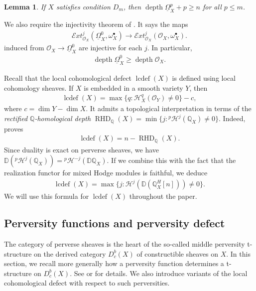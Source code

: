 \documentclass[11pt]{amsart}
\newtheorem{lemma}[equation]{Lemma}
\theoremstyle{definition}
\theoremstyle{plain}
\newcounter{intro}
\DeclareMathOperator{\lcdef}{lcdef}
\DeclareMathOperator{\depth}{depth}
\DeclareMathOperator{\RHD}{RHD}
\begin{document}
\begin{lemma}\label{lem condtion Dm}
If $X$ satisfies condition $D_m$, then $\depth \underline{\Omega}_X^p +p \geq n$ for all $p \leq m$. 
\end{lemma}

We also require the injectivity theorem of \cite{kovacs schwede}. It says the maps
\begin{align*}
    \mathscr{E}xt^j_{\mathscr{O}_X}(\underline{\Omega}_X^0, \omega_X^\bullet) \rightarrow \mathscr{E}xt^j_{\mathscr{O}_X}(\mathscr{O}_X, \omega_X^\bullet).
\end{align*}
induced from $\mathscr{O}_X \rightarrow \underline{\Omega}_X^0$ are injective for each $j$. In particular, 
\begin{align}\label{eqn depth inequ}
   \depth \underline{\Omega}_X^0 \geq \depth \mathscr{O}_X. 
\end{align}

Recall that the local cohomological defect $\lcdef(X)$ is defined using local cohomology sheaves. If $X$ is embedded in a smooth variety $Y$, then
\begin{align*}
    \lcdef(X) = \max \{ q : \mathcal{H}^q_X( \mathscr{O}_Y) \neq 0 \} - c,
\end{align*}
where $c = \dim Y - \dim X$. It admits a topological interpretation in terms of the \emph{rectified $\mathbb{Q}$-homological depth} $\RHD_\mathbb{Q}(X) = \min \{ j : {}^p \mathcal{H}^j(\mathbb{Q}_X) \neq 0 \}$. Indeed, \cite{saito lcdef} proves
\begin{align}\label{eqn lcdef top}
    \lcdef(X) = n - \RHD_\mathbb{Q}(X).
\end{align}
Since duality is exact on perverse sheaves, we have $\mathbb{D} ({}^p\mathcal{H}^{j}(\mathbb{Q}_X)) = {}^p\mathcal{H}^{-j}(\mathbb{D}\mathbb{Q}_X)$. If we combine this with the fact that the realization functor for mixed Hodge modules is faithful, we deduce
\begin{align}\label{eqn lcdef}
    \lcdef(X)= \max \{ j :  \mathcal{H}^j(\mathbb{D} (\mathbb{Q}_X^H[n])) \neq 0 \}.
\end{align}
We will use this formula for $\lcdef(X)$ throughout the paper. 


\subsection{Perversity functions and perversity defect}
The category of perverse sheaves is the heart of the so-called middle perversity t-structure on the derived category $D^b_c(X)$ of constructible sheaves on $X$. In this section, we recall more generally how a perversity function determines a t-structure on $D^b_c(X)$. See \cite{bbd} or \cite{kashiwara} for details. We also introduce variants of the local cohomological defect with respect to such perversities.
\end{document}
